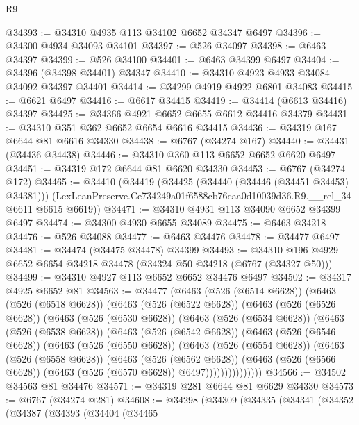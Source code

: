 \begin{lexlean}{R9}
\begin{coremodule}
@34393 := @34310 @4935 @113 @34102 @6652 @34347 @6497
@34396 := @34300 @4934 @34093 @34101
@34397 := @526 @34097
@34398 := @6463 @34397
@34399 := @526 @34100
@34401 := @6463 @34399 @6497
@34404 := @34396 (@34398 @34401) @34347
@34410 := @34310 @4923 @4933 @34084 @34092 @34397 @34401
@34414 := @34299 @4919 @4922 @6801 @34083
@34415 := @6621 @6497
@34416 := @6617 @34415
@34419 := @34414 (@6613 @34416) @34397
@34425 := @34366 @4921 @6652 @6655 @6612 @34416 @34379
@34431 := @34310 @351 @362 @6652 @6654 @6616 @34415
@34436 := @34319 @167 @6644 @81 @6616 @34330
@34438 := @6767 (@34274 @167)
@34440 := @34431 (@34436 @34438)
@34446 := @34310 @360 @113 @6652 @6652 @6620 @6497
@34451 := @34319 @172 @6644 @81 @6620 @34330
@34453 := @6767 (@34274 @172)
@34465 := @34410
    (@34419
      (@34425 (@34440 (@34446 (@34451 @34453) @34381)))
      (LexLeanPreserve.Ce734249a01f6588cb76caa0d10039d36.R9.__rel_34 @6611 @6615 @6619))
@34471 := @34310 @4931 @113 @34090 @6652 @34399 @6497
@34474 := @34300 @4930 @6655 @34089
@34475 := @6463 @34218
@34476 := @526 @34088
@34477 := @6463 @34476
@34478 := @34477 @6497
@34481 := @34474 (@34475 @34478) @34399
@34493 := @34310 @196 @4929 @6652 @6654 @34218 @34478 (@34324 @50 @34218 (@6767 (@34327 @50)))
@34499 := @34310 @4927 @113 @6652 @6652 @34476 @6497
@34502 := @34317 @4925 @6652 @81
@34563 := @34477
    (@6463
      (@526 (@6514 @6628))
      (@6463
        (@526 (@6518 @6628))
        (@6463
          (@526 (@6522 @6628))
          (@6463
            (@526 (@6526 @6628))
            (@6463
              (@526 (@6530 @6628))
              (@6463
                (@526 (@6534 @6628))
                (@6463
                  (@526 (@6538 @6628))
                  (@6463
                    (@526 (@6542 @6628))
                    (@6463
                      (@526 (@6546 @6628))
                      (@6463
                        (@526 (@6550 @6628))
                        (@6463
                          (@526 (@6554 @6628))
                          (@6463
                            (@526 (@6558 @6628))
                            (@6463
                              (@526 (@6562 @6628))
                              (@6463
                                (@526 (@6566 @6628))
                                (@6463 (@526 (@6570 @6628)) @6497)))))))))))))))
@34566 := @34502 @34563 @81 @34476
@34571 := @34319 @281 @6644 @81 @6629 @34330
@34573 := @6767 (@34274 @281)
@34608 := @34298
    (@34309
      (@34335
        (@34341
          (@34352
            (@34387
              (@34393
                (@34404
                  (@34465

\end{coremodule}
\end{lexlean}

